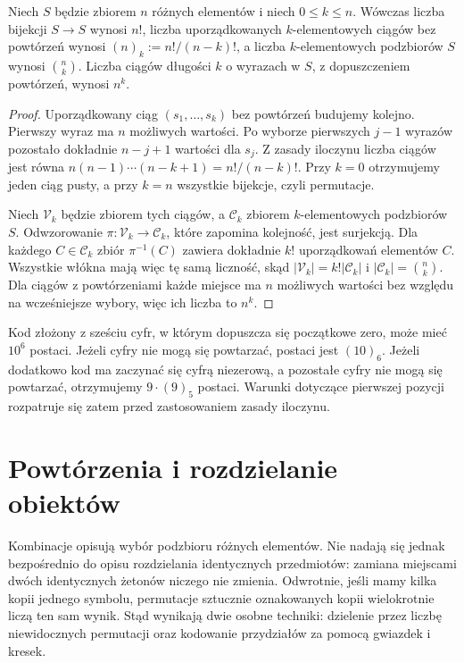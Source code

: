 \begin{twierdzenie}
Niech $S$ będzie zbiorem $n$ różnych elementów i niech $0\leq k\leq n$.
Wówczas liczba bijekcji $S\to S$ wynosi $n!$, liczba uporządkowanych
$k$-elementowych ciągów bez powtórzeń wynosi
$(n)_k:=n!/(n-k)!$, a liczba $k$-elementowych podzbiorów $S$ wynosi
$\binom nk$. Liczba ciągów długości $k$ o wyrazach w $S$, z dopuszczeniem
powtórzeń, wynosi $n^k$.
\end{twierdzenie}
\begin{proof}
Uporządkowany ciąg $(s_1,\ldots,s_k)$ bez powtórzeń
budujemy kolejno. Pierwszy wyraz ma $n$ możliwych wartości.
Po wyborze pierwszych $j-1$ wyrazów pozostało dokładnie
$n-j+1$ wartości dla $s_j$. Z zasady iloczynu liczba
ciągów jest równa
$n(n-1)\cdots(n-k+1)=n!/(n-k)!$.
Przy $k=0$ otrzymujemy jeden ciąg pusty,
a przy $k=n$ wszystkie bijekcje, czyli permutacje.

Niech $\mathcal V_k$ będzie zbiorem tych ciągów, a
$\mathcal C_k$ zbiorem $k$-elementowych podzbiorów $S$.
Odwzorowanie $\pi:\mathcal V_k\to\mathcal C_k$,
które zapomina kolejność, jest surjekcją. Dla
każdego $C\in\mathcal C_k$ zbiór $\pi^{-1}(C)$
zawiera dokładnie $k!$ uporządkowań elementów $C$.
Wszystkie włókna mają więc tę samą liczność, skąd
$|\mathcal V_k|=k!|\mathcal C_k|$ i
$|\mathcal C_k|=\binom nk$.
Dla ciągów z powtórzeniami każde miejsce ma $n$
możliwych wartości bez względu na wcześniejsze wybory,
więc ich liczba to $n^k$.
\end{proof}

\begin{przyklad}
Kod złożony z sześciu cyfr, w którym dopuszcza się początkowe zero,
może mieć $10^6$ postaci. Jeżeli cyfry nie mogą się powtarzać,
postaci jest $(10)_6$. Jeżeli dodatkowo kod ma zaczynać się cyfrą niezerową,
a pozostałe cyfry nie mogą się powtarzać, otrzymujemy
$9\cdot(9)_5$ postaci. Warunki dotyczące pierwszej pozycji rozpatruje się
zatem przed zastosowaniem zasady iloczynu.
\end{przyklad}

\section{Powtórzenia i rozdzielanie obiektów}
Kombinacje opisują wybór podzbioru różnych elementów. Nie nadają
się jednak bezpośrednio do opisu rozdzielania identycznych przedmiotów:
zamiana miejscami dwóch identycznych żetonów niczego nie zmienia.
Odwrotnie, jeśli mamy kilka kopii jednego symbolu, permutacje
sztucznie oznakowanych kopii wielokrotnie liczą ten sam wynik.
Stąd wynikają dwie osobne techniki: dzielenie przez liczbę
niewidocznych permutacji oraz kodowanie przydziałów
za pomocą gwiazdek i kresek.

